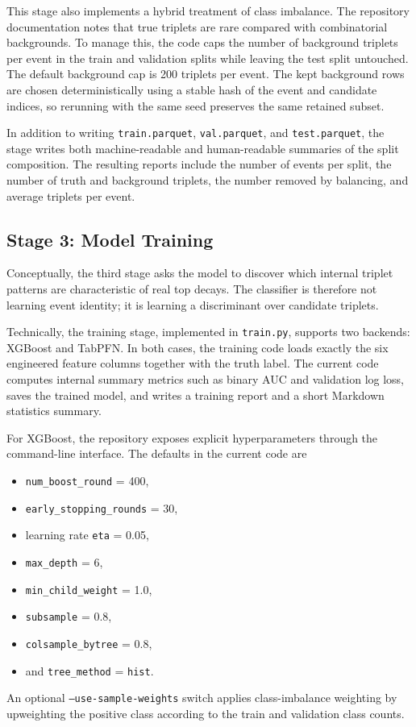 \documentclass[11pt]{article}
\begin{document}
This stage also implements a hybrid treatment of class imbalance. The repository documentation notes that true triplets are rare compared with combinatorial backgrounds. To manage this, the code caps the number of background triplets per event in the train and validation splits while leaving the test split untouched. The default background cap is 200 triplets per event. The kept background rows are chosen deterministically using a stable hash of the event and candidate indices, so rerunning with the same seed preserves the same retained subset.

In addition to writing \texttt{train.parquet}, \texttt{val.parquet}, and \texttt{test.parquet}, the stage writes both machine-readable and human-readable summaries of the split composition. The resulting reports include the number of events per split, the number of truth and background triplets, the number removed by balancing, and average triplets per event.

\subsection{Stage 3: Model Training}

Conceptually, the third stage asks the model to discover which internal triplet patterns are characteristic of real top decays. The classifier is therefore not learning event identity; it is learning a discriminant over candidate triplets.

Technically, the training stage, implemented in \texttt{train.py}, supports two backends: XGBoost and TabPFN. In both cases, the training code loads exactly the six engineered feature columns together with the truth label. The current code computes internal summary metrics such as binary AUC and validation log loss, saves the trained model, and writes a training report and a short Markdown statistics summary.

For XGBoost, the repository exposes explicit hyperparameters through the command-line interface. The defaults in the current code are
\begin{itemize}[leftmargin=*]
  \item \texttt{num\_boost\_round} = 400,
  \item \texttt{early\_stopping\_rounds} = 30,
  \item learning rate \texttt{eta} = 0.05,
  \item \texttt{max\_depth} = 6,
  \item \texttt{min\_child\_weight} = 1.0,
  \item \texttt{subsample} = 0.8,
  \item \texttt{colsample\_bytree} = 0.8,
  \item and \texttt{tree\_method} = \texttt{hist}.
\end{itemize}
An optional \texttt{--use-sample-weights} switch applies class-imbalance weighting by upweighting the positive class according to the train and validation class counts.
\end{document}
